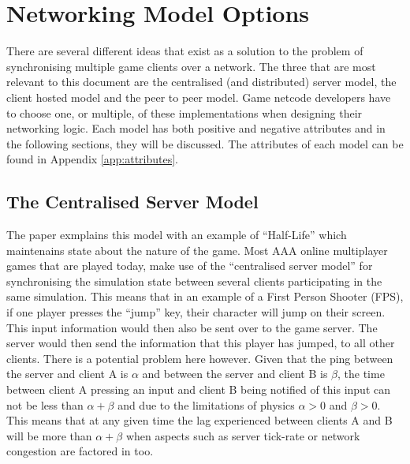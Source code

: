 \newpage
\section{Networking Model Options}
There are several different ideas that exist as a solution to the problem of synchronising multiple game clients over a network. The three that are most relevant to this document are the centralised (and distributed) server model, the client hosted model and the peer to peer model. Game netcode developers have to choose one, or multiple, of these implementations when designing their networking logic. Each model has both positive and negative attributes and in the following sections, they will be discussed. The attributes of each model can be found in Appendix \ref{app:attributes}.


\subsection{The Centralised Server Model}
The paper  exmplains this model with an example of ``Half-Life'' which maintenains state about the nature of the game. Most AAA online multiplayer games that are played today, make use of the ``centralised server model'' for synchronising the simulation state between several clients participating in the same simulation. This means that in an example of a First Person Shooter (FPS), if one player presses the ``jump'' key, their character will jump on their screen. This input information would then also be sent over to the game server. The server would then send the information that this player has jumped, to all other clients. There is a potential problem here however. Given that the ping between the server and client A is \(\alpha\) and between the server and client B is \(\beta\), the time between client A pressing an input and client B being notified of this input can not be less than $\alpha+\beta$ and due to the limitations of physics $\alpha>0$ and $\beta>0$. This means that at any given time the lag experienced between clients A and B will be more than $\alpha+\beta$ when aspects such as server tick-rate or network congestion are factored in too.


